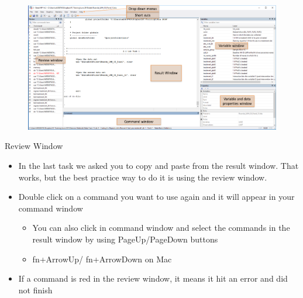 \documentclass[aspectratio=169]{beamer}
\begin{document}
\begin{frame}{}
\begin{figure}
	\centering
	\includegraphics[width=\linewidth]{img/window_des}
\end{figure}
\end{frame}

\begin{frame}{Review Window}

\begin{itemize}
	\item In the last task we asked you to copy and paste from the result window. That works, but the best practice way to do it is using the review window. 
	
	\item Double click on a command you want to use again and it will appear in your command window
	\begin{itemize}
		\item You can also click in command window and select the commands in the result window by using PageUp/PageDown buttons
		\item fn+ArrowUp/ fn+ArrowDown on Mac
	\end{itemize}
	\item If a command is red in the review window, it means it hit an error and did not finish
		
\end{itemize}

\end{frame}
\end{document}
